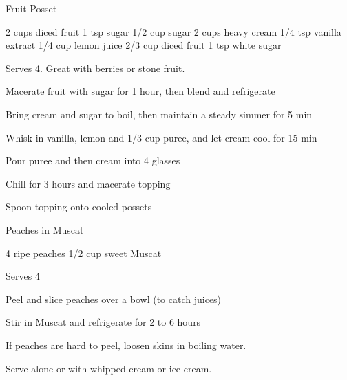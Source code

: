 
\begin{recipe}{Fruit Posset}{}
\begin{ingredients}
2 cups diced fruit
1 tsp sugar
1/2 cup sugar
2 cups heavy cream
1/4 tsp vanilla extract
1/4 cup lemon juice
2/3 cup diced fruit
1 tsp white sugar
\end{ingredients}
\nextcolumn
Serves 4. Great with berries or stone fruit.
\begin{steps}
    \item Macerate fruit with sugar for 1 hour, then blend and refrigerate
    \item Bring cream and sugar to boil, then maintain a steady simmer for 5 min
    \item Whisk in vanilla, lemon and 1/3 cup puree, and let cream cool for 15 min
    \item Pour puree and then cream into 4 glasses
    \item Chill for 3 hours and macerate topping
    \item Spoon topping onto cooled possets
\end{steps}
\end{recipe}

\begin{recipe}{Peaches in Muscat}{}
\begin{ingredients}
4 ripe peaches
1/2 cup sweet Muscat
\end{ingredients}
\nextcolumn
Serves 4
\begin{steps}
    \item Peel and slice peaches over a bowl (to catch juices)
    \item Stir in Muscat and refrigerate for 2 to 6 hours
\end{steps}
If peaches are hard to peel, loosen skins in boiling water.

Serve alone or with whipped cream or ice cream.
\end{recipe}

